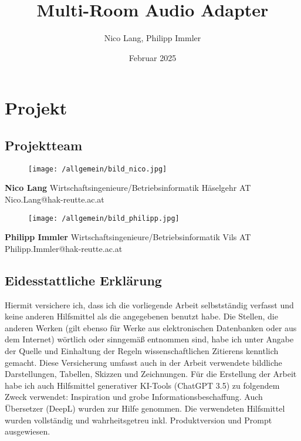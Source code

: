 \documentclass[11pt, twoside]{article}
\title{\textbf{Multi-Room Audio Adapter}}
\author{Nico Lang, Philipp Immler}
\date{Februar 2025}
\begin{document}
{}
\newpage
{}



\section*{Projekt}
\subsection*{Projektteam}
\begin{figure}[H]
	\texttt{[image: /allgemein/bild\_nico.jpg]}
\end{figure}
\textbf{Nico Lang}\newline
Wirtschaftsingenieure/Betriebsinformatik Häselgehr AT\newline
Nico.Lang@hak-reutte.ac.at\newline
\begin{figure}[H]
	\texttt{[image: /allgemein/bild\_philipp.jpg]}
\end{figure}
\noindent \textbf{Philipp Immler}\newline
Wirtschaftsingenieure/Betriebsinformatik Vils AT\newline
Philipp.Immler@hak-reutte.ac.at

\newpage

\subsection*{Eidesstattliche Erklärung}
Hiermit versichere ich, dass ich die vorliegende Arbeit selbstständig verfasst und keine anderen Hilfsmittel als die angegebenen benutzt habe. Die Stellen, die anderen Werken (gilt ebenso für Werke aus elektronischen Datenbanken oder aus dem Internet) wörtlich oder sinngemäß entnommen sind, habe ich unter Angabe der Quelle und Einhaltung der Regeln wissenschaftlichen Zitierens kenntlich gemacht. Diese Versicherung umfasst auch in der Arbeit verwendete bildliche Darstellungen, Tabellen, Skizzen und Zeichnungen. Für die Erstellung der Arbeit habe ich auch Hilfsmittel generativer KI-Tools (ChatGPT 3.5) zu folgendem Zweck verwendet: Inspiration und grobe Informationsbeschaffung. Auch Übersetzer (DeepL) wurden zur Hilfe genommen. Die verwendeten Hilfsmittel wurden vollständig und wahrheitsgetreu inkl. Produktversion und Prompt ausgewiesen.\\
\end{document}
